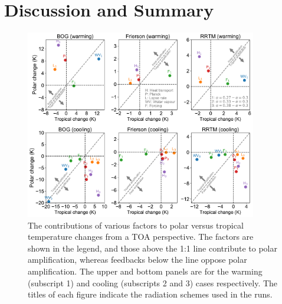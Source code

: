 

\section{Discussion and Summary}

 \begin{figure}
	\includegraphics[width=0.9\textwidth]{figs/polar_amp/contributions_to_polar_amplification.pdf}
	\caption{The contributions of various factors to polar versus tropical temperature changes from a TOA perspective. The factors are shown in the legend, and those above the 1:1 line contribute to polar amplification, whereas feedbacks below the line oppose polar amplification. The upper and bottom panels are for the warming (subscript 1) and cooling (subscripts 2 and 3) cases respectively. The titles of each figure indicate the radiation schemes used in the runs.}
	\label{fig:contribution_pole_vs_tropic}
\end{figure}

